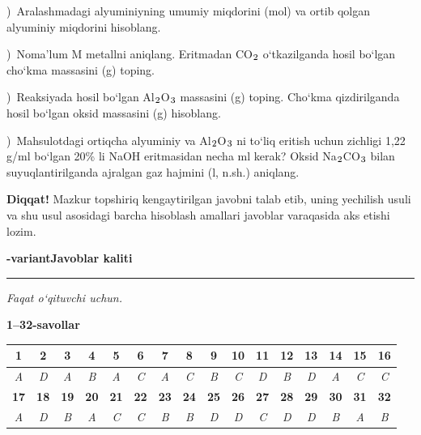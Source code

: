 \documentclass[11pt,a4paper]{article}
\renewcommand{\textsubscript}[1]{\ensuremath{_{\text{\fontsize{8}{8}\selectfont #1}}}}
\newcommand{\qsep}{\par\vspace{13pt}}
\newcommand{\diqqat}[1]{\par\smallskip\noindent\textbf{Diqqat!} #1\par\medskip}
\begin{document}
)\ Aralashmadagi alyuminiyning umumiy miqdorini (mol) va ortib qolgan alyuminiy miqdorini hisoblang.\par
{})\ Noma'lum M metallni aniqlang. Eritmadan CO\textsubscript{2} o`tkazilganda hosil bo`lgan cho`kma massasini (g) toping.\par
{})\ Reaksiyada hosil bo`lgan Al\textsubscript{2}O\textsubscript{3} massasini (g) toping. Cho`kma qizdirilganda hosil bo`lgan oksid massasini (g) hisoblang.\par
{})\ Mahsulotdagi ortiqcha alyuminiy va Al\textsubscript{2}O\textsubscript{3} ni to`liq eritish uchun zichligi 1,22 g/ml bo`lgan 20\% li NaOH eritmasidan necha ml kerak? Oksid Na\textsubscript{2}CO\textsubscript{3} bilan suyuqlantirilganda ajralgan gaz hajmini (l, n.sh.) aniqlang.\par
\diqqat{Mazkur topshiriq kengaytirilgan javobni talab etib, uning yechilish usuli va shu usul asosidagi barcha hisoblash amallari javoblar varaqasida aks etishi lozim.}\qsep
\newpage
\noindent\textbf{\fontsize{13}{15}-variant}\hfill \textbf{Javoblar kaliti}\par\smallskip\hrule\smallskip
\textit{Faqat o`qituvchi uchun.}\par\medskip
\noindent\textbf{1--32-savollar}\par\smallskip
\noindent\begin{tabular}{|c|c|c|c|c|c|c|c|c|c|c|c|c|c|c|c|}\hline
\textbf{1} & \textbf{2} & \textbf{3} & \textbf{4} & \textbf{5} & \textbf{6} & \textbf{7} & \textbf{8} & \textbf{9} & \textbf{10} & \textbf{11} & \textbf{12} & \textbf{13} & \textbf{14} & \textbf{15} & \textbf{16}\\\hline
\textsl{A} & \textsl{D} & \textsl{A} & \textsl{B} & \textsl{A} & \textsl{C} & \textsl{A} & \textsl{C} & \textsl{B} & \textsl{C} & \textsl{D} & \textsl{B} & \textsl{D} & \textsl{A} & \textsl{C} & \textsl{C}\\\hline
\textbf{17} & \textbf{18} & \textbf{19} & \textbf{20} & \textbf{21} & \textbf{22} & \textbf{23} & \textbf{24} & \textbf{25} & \textbf{26} & \textbf{27} & \textbf{28} & \textbf{29} & \textbf{30} & \textbf{31} & \textbf{32}\\\hline
\textsl{A} & \textsl{D} & \textsl{B} & \textsl{A} & \textsl{C} & \textsl{C} & \textsl{B} & \textsl{B} & \textsl{D} & \textsl{D} & \textsl{C} & \textsl{D} & \textsl{D} & \textsl{B} & \textsl{A} & \textsl{B}\\\hline
\end{tabular}\par\medskip
\end{document}
